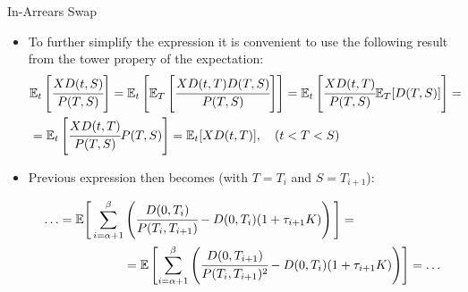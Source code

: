 \documentclass{beamer}
\begin{document}
\begin{frame}{In-Arrears Swap}
\begin{itemize}
\item To further simplify the expression it is convenient to use the following result from the tower propery of the expectation:
\begin{equation*}
\begin{aligned}
&\mathbb{E}_t\left[\cfrac{XD(t,S)}{P(T,S)} \right]=\mathbb{E}_t\left[\mathbb{E}_T\left[\cfrac{XD(t,T)D(T,S)}{P(T,S)} \right]\right]=\mathbb{E}_t\left[\cfrac{XD(t,T)}{P(T,S)}\mathbb{E}_T[D(T,S)]\right]= \\ 
& =\mathbb{E}_t\left[\cfrac{XD(t,T)}{P(T,S)}P(T,S)\right]=\mathbb{E}_t[XD(t,T)],\quad (t<T<S)
\end{aligned}
\end{equation*}

\item Previous expression then becomes (with $T=T_i$ and $S=T_{i+1}$):

\begin{equation*}
\begin{aligned}
\ldots=\mathbb{E}\Bigg[\sum_{i=\alpha+1}^{\beta}&\left(\cfrac{D(0,T_i)}{P(T_i,T_{i+1})}-D(0,T_i)(1+\tau_{i+1}K)\right)\Bigg] = \\
&=\mathbb{E}\left[\sum_{i=\alpha+1}^{\beta}\left(\cfrac{D(0,T_{i+1})}{P(T_i,T_{i+1})^2}-D(0,T_i)(1+\tau_{i+1}K)\right)\right] = \ldots
\end{aligned}
\end{equation*}
\end{itemize}
\end{frame}
\end{document}
